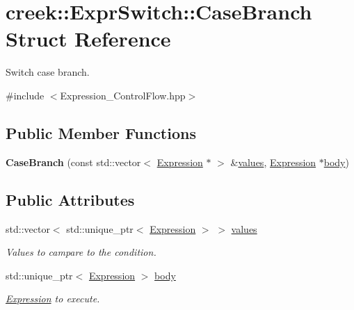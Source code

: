 \hypertarget{structcreek_1_1_expr_switch_1_1_case_branch}{}\section{creek\+:\+:Expr\+Switch\+:\+:Case\+Branch Struct Reference}
\label{structcreek_1_1_expr_switch_1_1_case_branch}


Switch case branch.  




{\ttfamily \#include $<$Expression\+\_\+\+Control\+Flow.\+hpp$>$}

\subsection*{Public Member Functions}
\begin{DoxyCompactItemize}
\item 
{\bfseries Case\+Branch} (const std\+::vector$<$ \hyperlink{classcreek_1_1_expression}{Expression} $\ast$ $>$ \&\hyperlink{structcreek_1_1_expr_switch_1_1_case_branch_a9b18380bfbe3d20de69cf5a6c0422c9a}{values}, \hyperlink{classcreek_1_1_expression}{Expression} $\ast$\hyperlink{structcreek_1_1_expr_switch_1_1_case_branch_a16c8b169e6a467acefb95c2fb6b0ba31}{body})\hypertarget{structcreek_1_1_expr_switch_1_1_case_branch_a7420d88afaf9f39e2530926413449954}{}\label{structcreek_1_1_expr_switch_1_1_case_branch_a7420d88afaf9f39e2530926413449954}

\end{DoxyCompactItemize}
\subsection*{Public Attributes}
\begin{DoxyCompactItemize}
\item 
std\+::vector$<$ std\+::unique\+\_\+ptr$<$ \hyperlink{classcreek_1_1_expression}{Expression} $>$ $>$ \hyperlink{structcreek_1_1_expr_switch_1_1_case_branch_a9b18380bfbe3d20de69cf5a6c0422c9a}{values}\hypertarget{structcreek_1_1_expr_switch_1_1_case_branch_a9b18380bfbe3d20de69cf5a6c0422c9a}{}\label{structcreek_1_1_expr_switch_1_1_case_branch_a9b18380bfbe3d20de69cf5a6c0422c9a}

\begin{DoxyCompactList}\small\item\em Values to campare to the condition. \end{DoxyCompactList}\item 
std\+::unique\+\_\+ptr$<$ \hyperlink{classcreek_1_1_expression}{Expression} $>$ \hyperlink{structcreek_1_1_expr_switch_1_1_case_branch_a16c8b169e6a467acefb95c2fb6b0ba31}{body}\hypertarget{structcreek_1_1_expr_switch_1_1_case_branch_a16c8b169e6a467acefb95c2fb6b0ba31}{}\label{structcreek_1_1_expr_switch_1_1_case_branch_a16c8b169e6a467acefb95c2fb6b0ba31}

\begin{DoxyCompactList}\small\item\em \hyperlink{classcreek_1_1_expression}{Expression} to execute. \end{DoxyCompactList}\end{DoxyCompactItemize}


